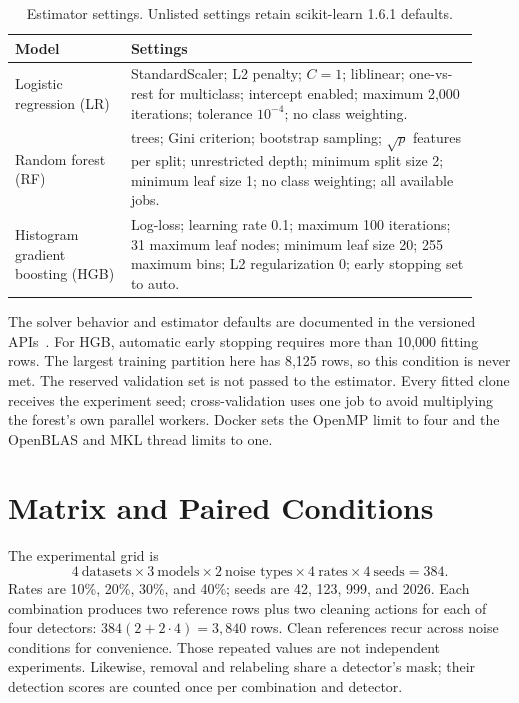 \begin{table}[htbp]
\centering\small
\caption{Estimator settings. Unlisted settings retain scikit-learn 1.6.1 defaults.}
\label{tab:parameters}
\begin{tabular}{>{\raggedright\arraybackslash}p{0.23\linewidth}>{\raggedright\arraybackslash}p{0.69\linewidth}}
\toprule
Model & Settings \\
\midrule
Logistic regression (LR) & StandardScaler; L2 penalty; $C=1$; liblinear;
one-vs-rest for multiclass; intercept enabled; maximum 2,000 iterations;
tolerance $10^{-4}$; no class weighting. \\
Random forest (RF) & 200 trees; Gini criterion; bootstrap sampling;
$\sqrt p$ features per split; unrestricted depth; minimum split size 2;
minimum leaf size 1; no class weighting; all available jobs. \\
Histogram gradient boosting (HGB) & Log-loss; learning rate 0.1; maximum
100 iterations; 31 maximum leaf nodes; minimum leaf size 20; 255 maximum bins;
L2 regularization 0; early stopping set to auto. \\
\bottomrule
\end{tabular}
\end{table}

The solver behavior and estimator defaults are documented in the versioned
APIs~\cite{sklearnLR,sklearnRF,sklearnHGB}. For HGB, automatic early stopping
requires more than 10,000 fitting rows. The largest training partition here
has 8,125 rows, so this condition is never met. The reserved validation set
is not passed to the estimator. Every fitted clone receives the experiment
seed; cross-validation uses one job to avoid multiplying the forest's own
parallel workers. Docker sets the OpenMP limit to four and the OpenBLAS and
MKL thread limits to one.

\section{Matrix and Paired Conditions}
The experimental grid is
\begin{equation}
4\ \text{datasets}\times3\ \text{models}\times2\ \text{noise types}
\times4\ \text{rates}\times4\ \text{seeds}=384.
\end{equation}
Rates are 10\%, 20\%, 30\%, and 40\%; seeds are 42, 123, 999, and 2026.
Each combination produces two reference rows plus two cleaning actions for
each of four detectors: $384(2+2\cdot4)=3,840$ rows. Clean references recur
across noise conditions for convenience. Those repeated values are not
independent experiments. Likewise, removal and relabeling share a detector's
mask; their detection scores are counted once per combination and detector.

